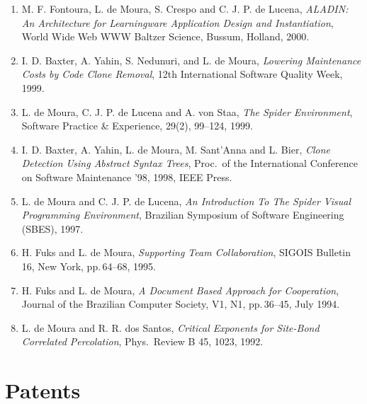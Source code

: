 \documentclass[11pt,a4paper]{article}
\begin{document}
\begin{enumerate}[leftmargin=*,itemsep=0.5ex,topsep=0.6ex]
\item M. F. Fontoura, L. de Moura, S. Crespo and C. J. P. de Lucena,
      {\em ALADIN: An Architecture for Learningware Application Design and Instantiation},
      World Wide Web WWW Baltzer Science, Bussum, Holland, 2000.

\item I. D. Baxter, A. Yahin, S. Nedunuri, and L. de Moura,
      {\em Lowering Maintenance Costs by Code Clone Removal},
      12th International Software Quality Week, 1999.

\item L. de Moura, C. J. P. de Lucena and A. von Staa,
      {\em The Spider Environment},
      Software Practice \& Experience, 29(2), 99--124, 1999.

\item I. D. Baxter, A. Yahin, L. de Moura, M. Sant'Anna and L. Bier,
      {\em Clone Detection Using Abstract Syntax Trees},
      Proc.\ of the International Conference on Software Maintenance '98, 1998, IEEE Press.

\item L. de Moura and C. J. P. de Lucena,
      {\em An Introduction To The Spider Visual Programming Environment},
      Brazilian Symposium of Software Engineering (SBES), 1997.

\item H. Fuks and L. de Moura,
      {\em Supporting Team Collaboration},
      SIGOIS Bulletin 16, New York, pp.\,64--68, 1995.

\item H. Fuks and L. de Moura,
      {\em A Document Based Approach for Cooperation},
      Journal of the Brazilian Computer Society, V1, N1, pp.\,36--45, July 1994.

\item L. de Moura and R. R. dos Santos,
      {\em Critical Exponents for Site-Bond Correlated Percolation},
      Phys.\ Review B 45, 1023, 1992.

\end{enumerate}

\section*{Patents}
\end{document}
